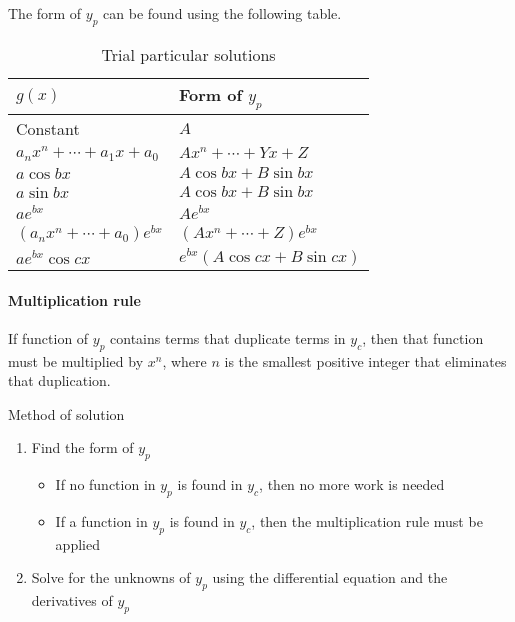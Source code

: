 \documentclass[10pt, twocolumn]{article}
\theoremstyle{definition}
\begin{document}
The form of \(y_p \) can be found using the following table.
\begin{table}[h!] %
  \caption{Trial particular solutions}
  \begin{center}
    \centering %
    \begin{tabular}{ %
        ll
      }

      \(g(x)\)                            & Form of \(y_p \)                  \\
      \hline
      Constant                            & \(A\)                             \\
      \(a_n x^n + \cdots + a_1 x + a_0 \) & \(A x^n + \cdots + Y x + Z\)      \\
      \(a\cos{bx}\)                       & \(A\cos{bx} + B\sin{bx}\)         \\
      \(a\sin{bx}\)                       & \(A\cos{bx} + B\sin{bx}\)         \\
      \(ae^{bx}\)                         & \(Ae^{bx}\)                       \\
      \((a_n x^n + \cdots + a_0 )e^{bx}\) & \((A x^n + \cdots + Z)e^{bx}\)    \\
      \(ae^{bx}\cos{cx}\)                 & \(e^{bx}(A\cos{cx} + B\sin{cx})\) \\
    \end{tabular}
  \end{center}
\end{table}

\paragraph*{Multiplication rule}
If function of \(y_p \) contains terms that duplicate terms in \(y_c \), then that function must be multiplied by \(x^n \), where \(n\) is the smallest positive integer that eliminates that duplication.

Method of solution
\begin{enumerate}
  \item Find the form of \(y_p \)
        \begin{itemize}
          \item If no function in \(y_p \) is found in \(y_c \), then no more work is needed
          \item If a function in \(y_p \) is found in \(y_c \), then the multiplication rule must be applied
        \end{itemize}
  \item Solve for the unknowns of \(y_p \) using the differential equation and the derivatives of \(y_p \)
\end{enumerate}
\end{document}
